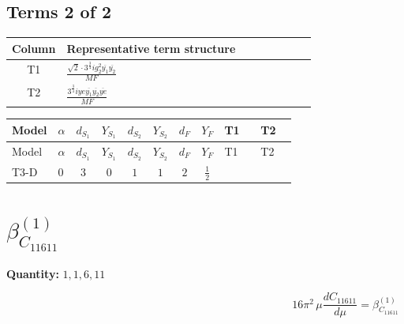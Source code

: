 \documentclass[8pt]{article}
\begin{document}
\begin{landscape}
\subsection*{Terms 2 of 2}
\begin{center}
\begin{tabular}{@{}c >{\raggedright\arraybackslash}p{0.82\linewidth}@{}}
\toprule
Column & Representative term structure \\
\midrule
T1 & \(\displaystyle \frac{\sqrt{2} \cdot 3^{\frac{3}{4}} i g_{2}^{2} \overline{y_{1}} \overline{y_{2}}}{MF}\) \\
\midrule
T2 & \(\displaystyle \frac{3^{\frac{3}{4}} i ye \overline{y_{1}} \overline{y_{2}} \overline{ye}}{MF}\) \\
\midrule
\bottomrule
\end{tabular}
\end{center}
\smallskip
\tiny
\begin{longtable}{@{}llcccccc >{\raggedright\arraybackslash}p{0.21\linewidth} >{\raggedright\arraybackslash}p{0.21\linewidth}@{}}
\toprule
Model & $\alpha$ & $d_{S_1}$ & $Y_{S_1}$ & $d_{S_2}$ & $Y_{S_2}$ & $d_F$ & $Y_F$ & T1 & T2 \\
\midrule
\endfirsthead
\toprule
Model & $\alpha$ & $d_{S_1}$ & $Y_{S_1}$ & $d_{S_2}$ & $Y_{S_2}$ & $d_F$ & $Y_F$ & T1 & T2 \\
\midrule
\endhead
T3-D & $0$ & $3$ & $0$ & $1$ & $1$ & $2$ & $\frac{1}{2}$ & \scriptsize\adjustbox{max width=\linewidth}{$\begin{gathered} - \frac{\sqrt{2} \cdot 3^{\frac{3}{4}} i g_{2}^{2} \overline{y_{1}} \overline{y_{2}}}{3 MF}\end{gathered}$} & \scriptsize\adjustbox{max width=\linewidth}{$\begin{gathered} \frac{3^{\frac{3}{4}} i ye \overline{y_{1}} \overline{y_{2}} \overline{ye}}{12 MF}\end{gathered}$} \\
\midrule
\bottomrule
\end{longtable}
\clearpage
\section*{$\beta_{C_{11611}}^{(1)}$}
\noindent\textbf{Quantity: }$\mathrm{1,1,6,11}$\par\smallskip
\[16\pi^2\,\mu\frac{d C_{11611}}{d\mu}=\beta_{C_{11611}}^{(1)}\]

\end{landscape}
\end{document}
